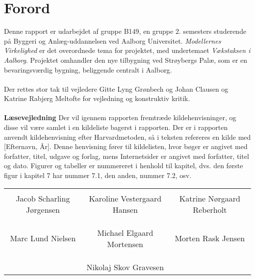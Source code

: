 \chapter*{Forord}
Denne rapport er udarbejdet af gruppe B149, en gruppe 2. semesters studerende på Byggeri og Anlæg-uddannelsen ved Aalborg Universitet. \textit{Modellernes Virkelighed} er det overordnede tema for projektet, med undertemaet \textit{Vækstaksen i Aalborg}. Projektet omhandler den nye tilbygning ved Strøybergs Palæ, som er en bevaringsværdig bygning, beliggende centralt i Aalborg. 
\\
\\
Der rettes stor tak til vejledere Gitte Lyng Grønbech og Johan Clausen og Katrine Rabjerg Meltofte for vejledning og konstruktiv kritik. 
\\
\\
\textbf{Læsevejledning}
\newline
Der vil igennem rapporten fremtræde kildehenvisninger, og disse vil være samlet i en kildeliste bagerst i rapporten. Der er i rapporten anvendt kildehenvisning efter Harvardmetoden, så i teksten refereres en kilde med [Efternavn, År]. Denne henvisning fører til kildelisten, hvor bøger er angivet med forfatter, titel, udgave og forlag, mens Internetsider er angivet med forfatter, titel og dato. Figurer og tabeller er nummereret i henhold til kapitel, dvs. den første figur i kapitel 7 har nummer 7.1, den anden, nummer 7.2, osv. 

\phantom{Luft}

\phantom{Luft}

\begin{table}[H]
	\centering
		\begin{tabular}{c c c}
			\underline{\phantom{mmmmmmmmmmmmmm}} & \underline{\phantom{mmmmmmmmmmmmmm}} & \underline{\phantom{mmmmmmmmmmmmmm}} \\
			Jacob Scharling Jørgensen			& Karoline Vestergaard Hansen 		& Katrine Nørgaard Reberholt 			\\
			&&\\
			&&\\
			\underline{\phantom{mmmmmmmmmmmmmm}} & \underline{\phantom{mmmmmmmmmmmmmm}} & \underline{\phantom{mmmmmmmmmmmmmm}} \\
			Marc Lund Nielsen			& Michael Elgaard Mortensen 		& Morten Rask Jensen 				\\
			&&\\
			&&\\
		& \underline{\phantom{mmmmmmmmmmmmmm}} 	&			\\														
		& Nikolaj Skov Gravesen 							& 					
		\end{tabular}
\end{table}